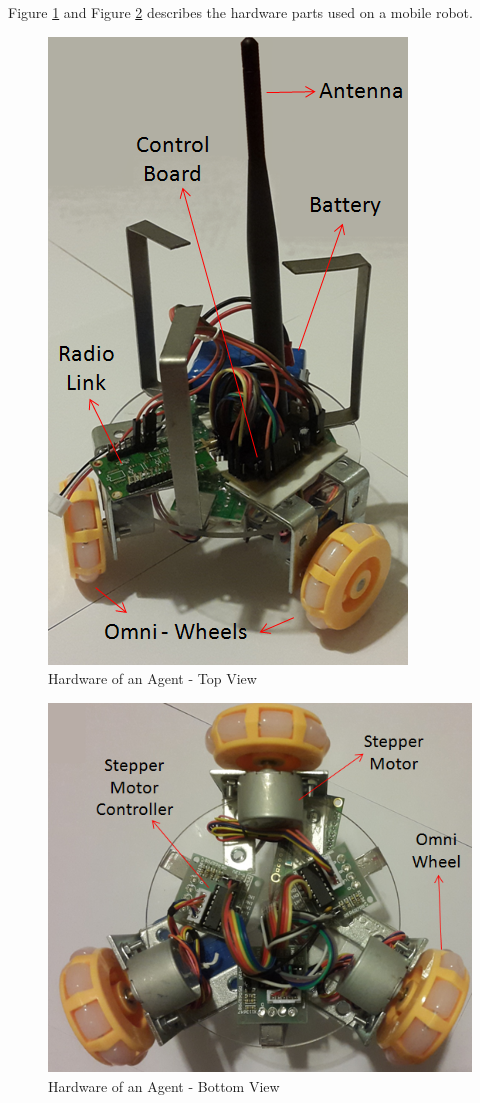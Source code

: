 Figure \ref{topview_ref} and Figure \ref{bottomview_ref} describes the hardware parts used on a mobile robot.

\begin{figure}[H]
\caption{Hardware of an Agent - Top View} \label{topview_ref}
\centerline{\includegraphics[scale = 0.80]{hardware1}}
\end{figure} 

\begin{figure}[H]
\caption{Hardware of an Agent - Bottom View} \label{bottomview_ref}
\centerline{\includegraphics[scale = 0.80]{hardware2}}
\end{figure} 
		
